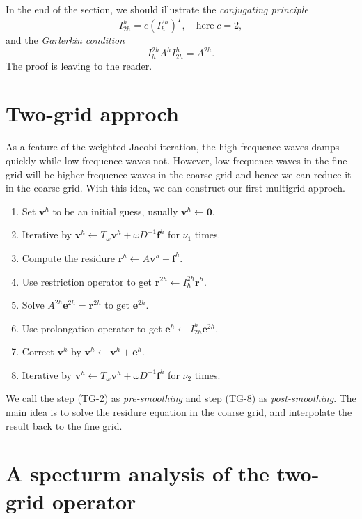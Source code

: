 \documentclass{SBCbookchapter}
\begin{document}
In the end of the section, we should illustrate the \textit{conjugating principle}
\begin{equation}
	I_{2h}^h=c\left(I_h^{2h}\right)^T,\quad \text{here}\; c=2,
\end{equation}
and the \textit{Garlerkin condition}
\begin{equation}
	I_h^{2h}A^hI_{2h}^h=A^{2h}.
\end{equation}
The proof is leaving to the reader.

\section{Two-grid approch}

As a feature of the weighted Jacobi iteration, the high-frequence waves damps quickly while low-frequence waves not. However, low-frequence waves in the fine grid will be higher-frequence waves in the coarse grid and hence we can reduce it in the coarse grid. With this idea, we can construct our first multigrid approch.

\begin{enumerate}[(TG-1)]
	\setlength{\itemsep}{-0.5ex}%
	\item Set $\mathbf{v}^h$ to be an initial guess, usually $\mathbf{v}^h\gets \mathbf{0}$.
	\item Iterative by $\mathbf{v}^h\gets T_\omega \mathbf{v}^h+\omega D^{-1} \mathbf{f}^h$ for $\nu_1$ times.
	\item Compute the residure $\mathbf{r}^h\gets A\mathbf{v}^h-\mathbf{f}^h$.
	\item Use restriction operator to get $\mathbf{r}^{2h}\gets I_h^{2h}\mathbf{r}^h$.
	\item Solve $A^{2h}\mathbf{e}^{2h}=\mathbf{r}^{2h}$ to get $\mathbf{e}^{2h}$.
	\item Use prolongation operator to get $\mathbf{e}^h\gets I_{2h}^h \mathbf{e}^{2h}$.
	\item Correct $\mathbf{v}^h$ by $\mathbf{v}^h\gets \mathbf{v}^h+\mathbf{e}^h$.
	\item Iterative by $\mathbf{v}^h\gets T_\omega \mathbf{v}^h+\omega D^{-1} \mathbf{f}^h$ for $\nu_2$ times.
\end{enumerate}

We call the step (TG-2) as \textit{pre-smoothing} and step (TG-8) as \textit{post-smoothing}. The main idea is to solve the residure equation in the coarse grid, and interpolate the result back to the fine grid.

\section{A specturm analysis of the two-grid operator}
\end{document}
